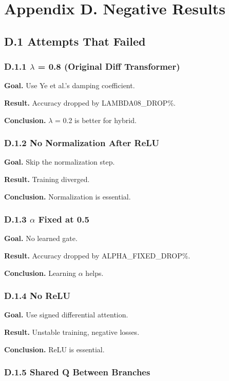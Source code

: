 \section{Appendix D. Negative Results}

\subsection{D.1 Attempts That Failed}

\subsubsection{D.1.1 $\lambda$ = 0.8 (Original Diff Transformer)}

\textbf{Goal.} Use Ye et al.'s damping coefficient.

\textbf{Result.} Accuracy dropped by {{LAMBDA08\_DROP}}\%.

\textbf{Conclusion.} $\lambda$ = 0.2 is better for hybrid.

\subsubsection{D.1.2 No Normalization After ReLU}

\textbf{Goal.} Skip the normalization step.

\textbf{Result.} Training diverged.

\textbf{Conclusion.} Normalization is essential.

\subsubsection{D.1.3 $\alpha$ Fixed at 0.5}

\textbf{Goal.} No learned gate.

\textbf{Result.} Accuracy dropped by {{ALPHA\_FIXED\_DROP}}\%.

\textbf{Conclusion.} Learning $\alpha$ helps.

\subsubsection{D.1.4 No ReLU}

\textbf{Goal.} Use signed differential attention.

\textbf{Result.} Unstable training, negative losses.

\textbf{Conclusion.} ReLU is essential.

\subsubsection{D.1.5 Shared Q Between Branches}


